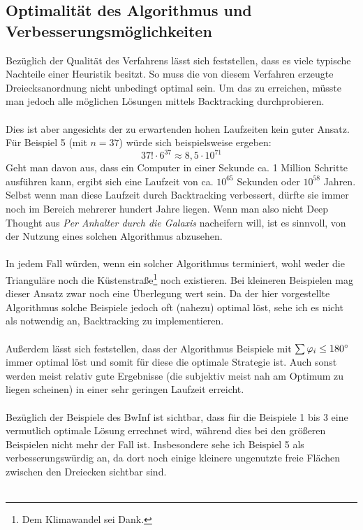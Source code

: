 \documentclass[a4paper, notitlepage, 12pt,headinclude]{scrartcl}
\begin{document}
  \subsection{Optimalität des Algorithmus und Verbesserungsmöglichkeiten}
  Bezüglich der Qualität des Verfahrens lässt sich feststellen, dass es viele typische Nachteile einer Heuristik besitzt. So muss die von diesem Verfahren erzeugte Dreiecksanordnung nicht unbedingt optimal sein. Um das zu erreichen, müsste man jedoch alle möglichen Lösungen mittels Backtracking durchprobieren. \\ \\
  Dies ist aber angesichts der zu erwartenden hohen Laufzeiten kein guter Ansatz. Für Beispiel 5 (mit $n = 37$) würde sich beispielsweise ergeben:
  \begin{equation}
  37! \cdot 6^{37} \approx 8,5 \cdot 10^{71}
  \end{equation}
  Geht man davon aus, dass ein Computer in einer Sekunde ca. 1 Million Schritte ausführen kann, ergibt sich eine Laufzeit von ca. $10^{65}$ Sekunden oder $10^{58}$ Jahren. Selbst wenn man diese Laufzeit durch Backtracking verbessert, dürfte sie immer noch im Bereich mehrerer hundert Jahre liegen. Wenn man also nicht Deep Thought aus \textit{Per Anhalter durch die Galaxis} nacheifern will, ist es sinnvoll, von der Nutzung eines solchen Algorithmus abzusehen. \\ \\
  In jedem Fall würden, wenn ein solcher Algorithmus terminiert, wohl weder die Trianguläre noch die Küstenstraße\footnote{Dem Klimawandel sei Dank.} noch existieren. Bei kleineren Beispielen mag dieser Ansatz zwar noch eine Überlegung wert sein. Da der hier vorgestellte Algorithmus solche Beispiele jedoch oft (nahezu) optimal löst, sehe ich es nicht als notwendig an, Backtracking zu implementieren. \\ \\
  Außerdem lässt sich feststellen, dass der Algorithmus Beispiele mit $\sum \varphi_i \leq 180\degree$ immer optimal löst und somit für diese die optimale Strategie ist. Auch sonst werden meist relativ gute Ergebnisse (die subjektiv meist nah am Optimum zu liegen scheinen) in einer sehr geringen Laufzeit erreicht. \\ \\
  Bezüglich der Beispiele des BwInf ist sichtbar, dass für die Beispiele 1 bis 3 eine vermutlich optimale Lösung errechnet wird, während dies bei den größeren Beispielen nicht mehr der Fall ist. Insbesondere sehe ich Beispiel 5 als verbesserungswürdig an, da dort noch einige kleinere ungenutzte freie Flächen zwischen den Dreiecken sichtbar sind. \\ \\
\end{document}
